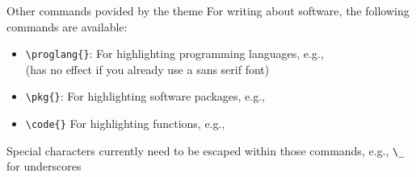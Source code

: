 \documentclass[pdfpagelabels=false, usepdftitle=false]{beamer}
\begin{document}
\begin{frame}[fragile]{Other commands povided by the theme}
For writing about software, the following commands are available:

\bigskip
\begin{itemize}
  \item \verb+\proglang{}+: For highlighting programming languages, e.g.,
   \\
  \smallskip
  {\small (has no effect if you already use a sans serif font)}
  \medskip
  \item \verb+\pkg{}+: For highlighting software packages, e.g., 
  \medskip
  \item \verb+\code{}+ For highlighting functions, e.g.,
\end{itemize}

\vfill

\begin{itemize}
  \arrowitem Special characters currently need to be escaped within those
  commands, e.g., \verb+\_+ for underscores
\end{itemize}
\end{frame}
\end{document}
